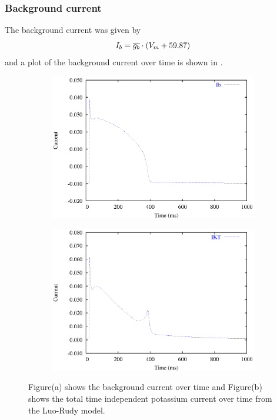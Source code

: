 \subsubsection{Background current}
The background current was given by
\begin{equation}
  I_b=\overline{g_{b}}\cdot \left( V_m+59.87 \right)
\end{equation}
and a plot of the background current over time is shown in .
\begin{figure}[hbtp] 
  \centering
  \begin{subfigure}[b]{0.45\linewidth}
    \centering
    \includegraphics[width=\textwidth]{cardiac_electrophysiology/epsfiles/LR_Ib.eps}
    \caption{}
  \end{subfigure}
  \hfill
  \begin{subfigure}[b]{0.45\linewidth}
    \centering
    \includegraphics[width=\textwidth]{cardiac_electrophysiology/epsfiles/LR_IKT.eps}
    \caption{}
  \end{subfigure}
  \caption[Background and total time independent currents from the Luo-Rudy
  model]{Figure(a) shows the 
    background current over time and Figure(b) shows the total time
    independent potassium current over time from the Luo-Rudy model.}
  \label{fig:LR_IbK1T_traces}
\end{figure}
%
